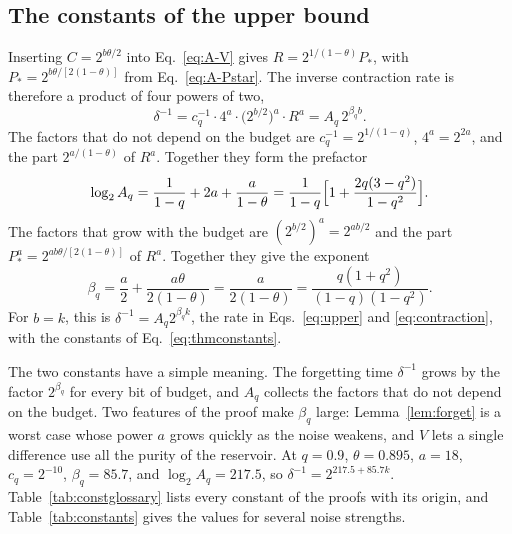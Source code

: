 \documentclass[aps,pra,reprint,superscriptaddress,floatfix]{revtex4-2}
\theoremstyle{plain}
\begin{document}
\subsection{The constants of the upper bound}
\label{app:constants}

Inserting $C=2^{b\theta/2}$ into Eq.~\eqref{eq:A-V} gives $R=2^{1/(1-\theta)}P_*$, with $P_*=2^{b\theta/[2(1-\theta)]}$ from Eq.~\eqref{eq:A-Pstar}. The inverse contraction rate is therefore a product of four powers of two,
\begin{equation}
\delta^{-1}=c_q^{-1}\cdot4^a\cdot\bigl(2^{b/2}\bigr)^a\cdot R^a=A_q\,2^{\beta_qb}.
\label{eq:A-deltainv}
\end{equation}
The factors that do not depend on the budget are $c_q^{-1}=2^{1/(1-q)}$, $4^a=2^{2a}$, and the part $2^{a/(1-\theta)}$ of $R^a$. Together they form the prefactor
\begin{equation}
\log_2A_q=\frac1{1-q}+2a+\frac a{1-\theta}=\frac{1}{1-q}\Bigl[1+\frac{2q(3-q^2)}{1-q^2}\Bigr].
\label{eq:A-constants}
\end{equation}
The factors that grow with the budget are $(2^{b/2})^a=2^{ab/2}$ and the part $P_*^a=2^{ab\theta/[2(1-\theta)]}$ of $R^a$. Together they give the exponent
\begin{equation}
\beta_q=\frac a2+\frac{a\theta}{2(1-\theta)}=\frac a{2(1-\theta)}=\frac{q(1+q^2)}{(1-q)(1-q^2)}.
\label{eq:A-beta}
\end{equation}
For $b=k$, this is $\delta^{-1}=A_q2^{\beta_qk}$, the rate in Eqs.~\eqref{eq:upper} and \eqref{eq:contraction}, with the constants of Eq.~\eqref{eq:thmconstants}.

The two constants have a simple meaning. The forgetting time $\delta^{-1}$ grows by the factor $2^{\beta_q}$ for every bit of budget, and $A_q$ collects the factors that do not depend on the budget. Two features of the proof make $\beta_q$ large: Lemma~\ref{lem:forget} is a worst case whose power $a$ grows quickly as the noise weakens, and $V$ lets a single difference use all the purity of the reservoir. At $q=0.9$, $\theta=0.895$, $a=18$, $c_q=2^{-10}$, $\beta_q=85.7$, and $\log_2A_q=217.5$, so $\delta^{-1}=2^{217.5+85.7k}$. Table~\ref{tab:constglossary} lists every constant of the proofs with its origin, and Table~\ref{tab:constants} gives the values for several noise strengths.
\end{document}
